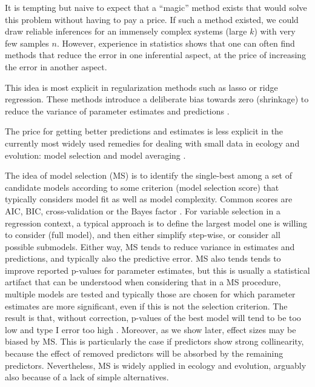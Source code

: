 \documentclass[5p]{elsarticle}
\begin{document}
It is tempting but naive to expect that a ``magic'' method exists that would solve this problem without having to pay a price. If such a method existed, we could draw reliable inferences for an immensely complex systems (large $k$) with very few samples $n$. However, experience in statistics shows that one can often find methods that reduce the error in one inferential aspect, at the price of increasing the error in another aspect. 

This idea is most explicit in regularization methods such as lasso or ridge regression. These methods introduce a deliberate bias towards zero (shrinkage) to reduce the variance of parameter estimates and predictions \citep[e.g.,]{Tibshirani-RegressionShrinkageand-1996, Morrissey-Insearchbest-2014}. 

The price for getting better predictions and estimates is less explicit in the currently most widely used remedies for dealing with small data in ecology and evolution: model selection and model averaging \citep[e.g.,][]{Johnson-Modelselectionin-2004, Burnham-Modelselectionand-2002}. 

The idea of model selection (MS) is to identify the single-best among a set of candidate models according to some criterion (model selection score) that typically considers model fit as well as model complexity. Common scores are AIC, BIC, cross-validation or the Bayes factor \citep[see, e.g,]{Johnson-Modelselectionin-2004}. For variable selection in a regression context, a typical approach is to define the largest model one is willing to consider (full model), and then either simplify step-wise, or consider all possible submodels. Either way, MS tends to reduce variance in estimates and predictions, and typically also the predictive error. MS also tends tends to improve reported p-values for parameter estimates, but this is usually a statistical artifact that can be understood when considering that in a MS procedure, multiple models are tested and typically those are chosen for which parameter estimates are more significant, even if this is not the selection criterion. The result is that, without correction, p-values of the best model will tend to be too low and type I error too high \citep{Freedman-NoteScreeningRegression-1983, Mundry-StepwiseModelFitting-2009}. Moreover, as we show later, effect sizes may be biased by MS. This is particularly the case if predictors show strong collinearity, because the effect of removed predictors will be absorbed by the remaining predictors. Nevertheless, MS is widely applied in ecology and evolution, arguably also because of a lack of simple alternatives.
\end{document}
